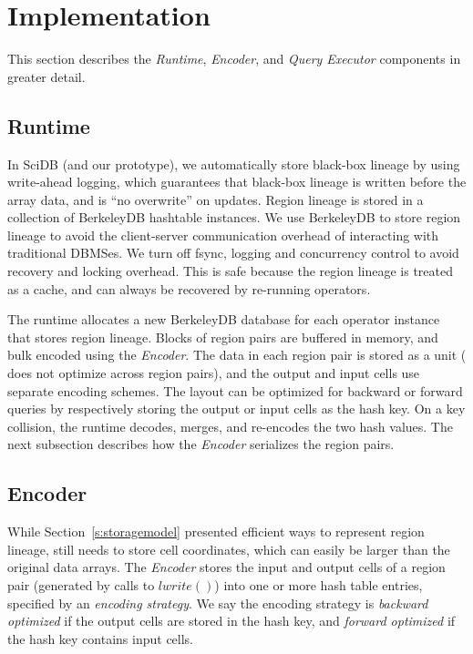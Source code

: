 
\section{Implementation}
\label{s:imp}

This section describes the {\it Runtime}, {\it Encoder}, and  {\it Query
Executor}  components in greater detail.



\subsection{Runtime}

In SciDB (and our prototype), we automatically store black-box lineage by using
write-ahead logging, which guarantees that black-box lineage is written before
the array data, and is ``no overwrite'' on updates.  Region lineage is stored
in a collection of BerkeleyDB hashtable instances.  We use BerkeleyDB to store
region lineage to avoid the client-server communication overhead of interacting
with traditional DBMSes.  We turn off fsync, logging and concurrency control to
avoid recovery and locking overhead.  This is safe because the region lineage
is treated as a cache, and can always be recovered by re-running operators.  

The runtime allocates a new BerkeleyDB database for each operator instance that
stores region lineage.  Blocks of region pairs are buffered in memory, and
bulk encoded using the {\it Encoder}.  The data in each region pair is stored
as a unit (\sys{} does not optimize across region pairs), and the output and
input cells use separate encoding schemes.  The layout can be optimized for
backward or forward queries by respectively storing the output or input cells
as the hash key.  On a key collision, the runtime decodes, merges, and
re-encodes the two hash values.  The next subsection describes how the {\it
Encoder} serializes the region pairs. 


\subsection{Encoder}
\label{s:encoder}



While Section~\ref{s:storagemodel} presented efficient ways to represent region
lineage, \sys{} still needs to store cell coordinates, which can easily be
larger than the original data arrays.  The {\it Encoder} stores the input and
output cells of a region pair (generated by calls to $lwrite()$) into one or
more hash table entries, specified by an {\it encoding strategy}. We say the encoding
strategy is {\it backward optimized} if the output cells  are stored in the hash key,
and {\it forward optimized} if the hash key contains input cells.  

